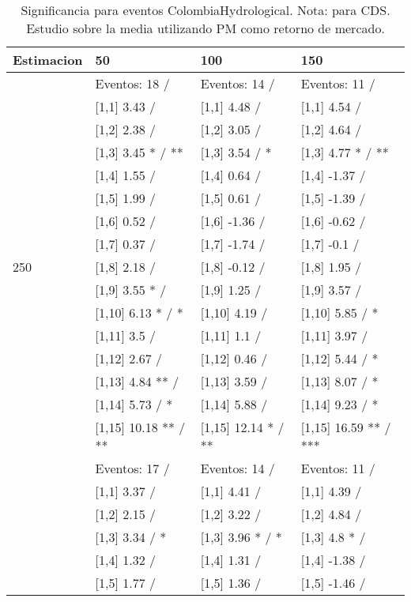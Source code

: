 \begin{table}

\caption{Significancia para eventos ColombiaHydrological. Nota: para CDS. Estudio sobre la media utilizando PM como retorno de mercado.}
\centering
\begin{tabular}[t]{llll}
\toprule
Estimacion & 50 & 100 & 150\\
\midrule
 & Eventos:  18 / & Eventos:  14 / & Eventos:  11 /\\
 & {}[1,1] 3.43  / & {}[1,1] 4.48  / & {}[1,1] 4.54  /\\
 & {}[1,2] 2.38  / & {}[1,2] 3.05  / & {}[1,2] 4.64  /\\
 & {}[1,3] 3.45 * / ** & {}[1,3] 3.54  / * & {}[1,3] 4.77 * / **\\
 & {}[1,4] 1.55  / & {}[1,4] 0.64  / & {}[1,4] -1.37  /\\
\addlinespace
 & {}[1,5] 1.99  / & {}[1,5] 0.61  / & {}[1,5] -1.39  /\\
 & {}[1,6] 0.52  / & {}[1,6] -1.36  / & {}[1,6] -0.62  /\\
 & {}[1,7] 0.37  / & {}[1,7] -1.74  / & {}[1,7] -0.1  /\\
250 & {}[1,8] 2.18  / & {}[1,8] -0.12  / & {}[1,8] 1.95  /\\
 & {}[1,9] 3.55 * / & {}[1,9] 1.25  / & {}[1,9] 3.57  /\\
\addlinespace
 & {}[1,10] 6.13 * / * & {}[1,10] 4.19  / & {}[1,10] 5.85  / *\\
 & {}[1,11] 3.5  / & {}[1,11] 1.1  / & {}[1,11] 3.97  /\\
 & {}[1,12] 2.67  / & {}[1,12] 0.46  / & {}[1,12] 5.44  / *\\
 & {}[1,13] 4.84 ** / & {}[1,13] 3.59  / & {}[1,13] 8.07  / *\\
 & {}[1,14] 5.73  / * & {}[1,14] 5.88  / & {}[1,14] 9.23  / *\\
\addlinespace
 & {}[1,15] 10.18 ** / ** & {}[1,15] 12.14 * / ** & {}[1,15] 16.59 ** / ***\\
 & Eventos:  17 / & Eventos:  14 / & Eventos:  11 /\\
 & {}[1,1] 3.37  / & {}[1,1] 4.41  / & {}[1,1] 4.39  /\\
 & {}[1,2] 2.15  / & {}[1,2] 3.22  / & {}[1,2] 4.84  /\\
 & {}[1,3] 3.34  / * & {}[1,3] 3.96 * / * & {}[1,3] 4.8 * /\\
\addlinespace
 & {}[1,4] 1.32  / & {}[1,4] 1.31  / & {}[1,4] -1.38  /\\
 & {}[1,5] 1.77  / & {}[1,5] 1.36  / & {}[1,5] -1.46  /\\

\end{tabular}
\end{table}
